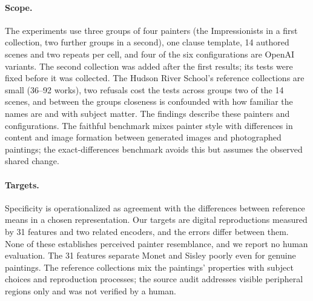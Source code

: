 \documentclass[10pt]{article}
\begin{document}
\paragraph{Scope.} The experiments use three groups of four painters (the Impressionists in a
first collection, two further groups in a second), one clause template, 14 authored scenes and two
repeats per cell, and four of the six configurations are OpenAI variants. The second collection
was added after the first results; its tests were fixed before it was collected. The Hudson River
School's reference collections are small (36--92 works), two refusals cost the tests across groups
two of the 14 scenes, and between the groups closeness is confounded with how familiar the names
are and with subject matter. The findings describe these painters and configurations. The faithful benchmark mixes painter style with
differences in content and image formation between generated images and photographed paintings; the
exact-differences benchmark avoids this but assumes the observed shared change.

\paragraph{Targets.} Specificity is operationalized as agreement with the differences between
reference means in a chosen representation. Our targets are digital reproductions measured by 31
features and two related encoders, and the errors differ between them. None of these establishes
perceived painter resemblance, and we report no human evaluation. The 31 features separate Monet
and Sisley poorly even for genuine paintings. The reference collections mix the paintings'
properties with subject choices and reproduction processes; the source audit addresses visible
peripheral regions only and was not verified by a human.
\end{document}
